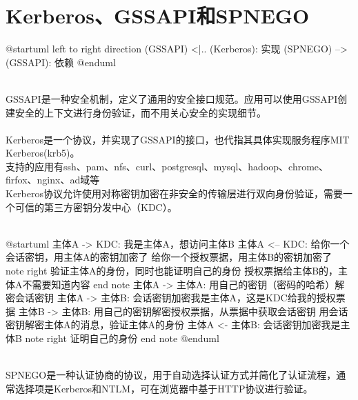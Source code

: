 \documentclass[a4paper]{scrartcl}
\begin{document}
\tableofcontents
\clearpage
\section{Kerberos、GSSAPI和SPNEGO}
\begin{plantuml}
    @startuml
    left to right direction
    (GSSAPI) <|.. (Kerberos): 实现
    (SPNEGO) --> (GSSAPI): 依赖
    @enduml
\end{plantuml}
\\
GSSAPI是一种安全机制，定义了通用的安全接口规范。应用可以使用GSSAPI创建安全的上下文进行身份验证，而不用关心安全的实现细节。
\\
\\
Kerberos是一个协议，并实现了GSSAPI的接口，也代指其具体实现服务程序MIT Kerberos(krb5)。
\\
支持的应用有ssh、pam、nfs、curl、postgresql、mysql、hadoop、chrome、firfox、nginx、ad域等
\\
Kerberos协议允许使用对称密钥加密在非安全的传输层进行双向身份验证，需要一个可信的第三方密钥分发中心（KDC）。
\\\\
\begin{plantuml}
@startuml
主体A -> KDC: 我是主体A，想访问主体B
主体A <-- KDC: 给你一个会话密钥，用主体A的密钥加密了 \n 给你一个授权票据，用主体B的密钥加密了
note right
验证主体A的身份，同时也能证明自己的身份
授权票据给主体B的，主体A不需要知道内容
end note
主体A -> 主体A: 用自己的密钥（密码的哈希）解密会话密钥
主体A -> 主体B: 会话密钥加密{我是主体A}，这是KDC给我的授权票据
主体B -> 主体B: 用自己的密钥解密授权票据，从票据中获取会话密钥 \n 用会话密钥解密主体A的消息，验证主体A的身份
主体A <- 主体B: 会话密钥加密{我是主体B}
note right
证明自己的身份
end note
@enduml
\end{plantuml}
\\
SPNEGO是一种认证协商的协议，用于自动选择认证方式并简化了认证流程，通常选择项是Kerberos和NTLM，可在浏览器中基于HTTP协议进行验证。
\clearpage
\end{document}
